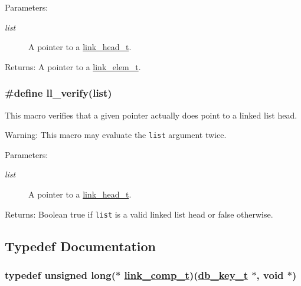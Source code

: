 \begin{Desc}
\item[Parameters:]
\begin{description}
\item[{\em list}]A pointer to a \hyperlink{group__dbprim__link_a0}{link\_\-head\_\-t}.\end{description}
\end{Desc}
\begin{Desc}
\item[Returns:]A pointer to a \hyperlink{group__dbprim__link_a1}{link\_\-elem\_\-t}. \end{Desc}
\hypertarget{group__dbprim__link_a14}{
\subsubsection[ll\_\-verify]{\setlength{\rightskip}{0pt plus 5cm}\#define ll\_\-verify(list)}}
\label{group__dbprim__link_a14}


This macro verifies that a given pointer actually does point to a linked list head.

\begin{Desc}
\item[Warning:]This macro may evaluate the {\tt list} argument twice.\end{Desc}
\begin{Desc}
\item[Parameters:]
\begin{description}
\item[{\em list}]A pointer to a \hyperlink{group__dbprim__link_a0}{link\_\-head\_\-t}.\end{description}
\end{Desc}
\begin{Desc}
\item[Returns:]Boolean true if {\tt list} is a valid linked list head or false otherwise. \end{Desc}


\subsection{Typedef Documentation}
\hypertarget{group__dbprim__link_a3}{
\subsubsection[link\_\-comp\_\-t]{\setlength{\rightskip}{0pt plus 5cm}typedef unsigned long($\ast$ \hyperlink{dbprim_8h_a3}{link\_\-comp\_\-t})(\hyperlink{dbprim_8h_a0}{db\_\-key\_\-t} $\ast$, void $\ast$)}}
\label{group__dbprim__link_a3}


